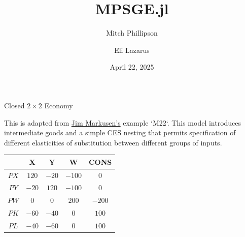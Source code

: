 \documentclass{beamer}
\begin{document}
\title{MPSGE.jl}
\author{Mitch Phillipson  \and Eli Lazarus }


\date{April 22, 2025}

\maketitle


\begin{frame}{Closed $2\times 2$ Economy}

    This is adapted from \href{https://mpsge.org/tutorial.pdf}{Jim Markusen's} example `M22`. This model introduces intermediate goods and a simple CES nesting that permits specification of different elasticities of substitution between different groups of inputs. 

    \pause
    \vspace{1cm}

    \begin{center}
        \begin{tabular}{ccccc}
                  & X     & Y     & W      & CONS    \\ \hline
            $PX$  & $120$ & $-20$ & $-100$ & $0   $  \\
            $PY$  & $-20$ & $120$ & $-100$ & $0   $  \\
            $PW$  & $0  $ & $0  $ & $200 $ & $-200$  \\
            $PK$  & $-60$ & $-40$ & $0   $ & $100 $  \\
            $PL$  & $-40$ & $-60$ & $0   $ & $100 $  
        \end{tabular}
    \end{center}

\end{frame}
\end{document}
